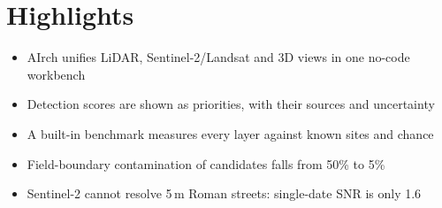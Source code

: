 \documentclass[review,12pt]{elsarticle}
\begin{document}
\section*{Highlights}
\begin{itemize}
\item AIrch unifies LiDAR, Sentinel-2/Landsat and 3D views in one no-code workbench
\item Detection scores are shown as priorities, with their sources and uncertainty
\item A built-in benchmark measures every layer against known sites and chance
\item Field-boundary contamination of candidates falls from 50\% to 5\%
\item Sentinel-2 cannot resolve 5\,m Roman streets: single-date SNR is only 1.6
\end{itemize}
\end{document}
